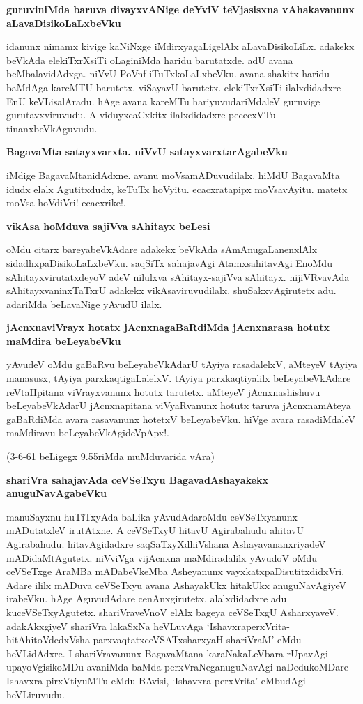 \noindent
\textbf{guruviniMda baruva divayxvANige deYviV teVjasisxna vAhakavanunx aLavaDisikoLaLxbeVku}\label{page79}

idanunx nimamx kivige kaNiNxge iMdirxyagaLigelAlx aLavaDisikoLiLx. adakekx beVkAda elekiTxrXsiTi oLaginiMda haridu barutatxde. adU avana beMbalavidAdxga. niVvU PoVnf iTuTxkoLaLxbeVku. avana shakitx haridu baMdAga kareMTU barutetx. viSayavU barutetx. elekiTxrXsiTi ilalxdidadxre EnU keVLisalAradu. hAge avana kareMTu hariyuvudariMdaleV guruvige gurutavxviruvudu. A viduyxcaCxkitx ilalxdidadxre pececxVTu tinanxbeVkAguvudu.

\noindent
\textbf{BagavaMta satayxvarxta. niVvU satayxvarxtarAgabeVku}\label{page79}

iMdige BagavaMtanidAdxne. avanu moVsamADuvudilalx. hiMdU BagavaMta idudx elalx Agutitxdudx, keTuTx hoVyitu. ecacxratapipx moVsavAyitu. matetx moVsa hoVdiVri! ecacxrike!.

\noindent
\textbf{vikAsa hoMduva sajiVva sAhitayx beLesi}

oMdu citarx bareyabeVkAdare adakekx beVkAda sAmAnugaLanenxlAlx sidadhxpaDisikoLaLxbeVku. saqSiTx sahajavAgi AtamxsahitavAgi EnoMdu sAhitayxvirutatxdeyoV adeV nilulxva sAhitayx-sajiVva sAhitayx. nijiVRvavAda sAhitayxvaninxTaTxrU adakekx vikAsaviruvudilalx. shuSakxvAgirutetx adu. adariMda beLavaNige yAvudU ilalx.

\noindent
\textbf{jAcnxnaviVrayx hotatx jAcnxnagaBaRdiMda jAcnxnarasa hotutx maMdira beLeyabeVku}\label{page79}

yAvudeV oMdu gaBaRvu beLeyabeVkAdarU tAyiya rasadalelxV, aMteyeV tAyiya manasusx, tAyiya parxkaqtigaLalelxV. tAyiya parxkaqtiyalilx beLeyabeVkAdare reVtaHpitana viVrayxvanunx hotutx tarutetx. aMteyeV jAcnxnashishuvu beLeyabeVkAdarU jAcnxnapitana viVyaRvanunx hotutx taruva jAcnxnamAteya gaBaRdiMda avara rasavanunx hotetxV beLeyabeVku. hiVge avara rasadiMdaleV maMdiravu beLeyabeVkAgideVpApx!.

(3-6-61 beLigegx 9.55riMda muMduvarida vAra)

\noindent
\textbf{shariVra sahajavAda ceVSeTxyu BagavadAshayakekx anuguNavAgabeVku}\label{page80}

manuSayxnu huTiTxyAda baLika yAvudAdaroMdu ceVSeTxyanunx mADutatxleV irutAtxne. A ceVSeTxyU hitavU Agirabahudu ahitavU Agirabahudu. hitavAgidadxre saqSaTxyXdhiVshana AshayavananxriyadeV mADidaMtAgutetx. niVviVga vijAcnxna maMdiradalilx yAvudoV oMdu ceVSeTxge AraMBa mADabeVkeMba Asheyanunx vayxkatxpaDisutitxdidxVri. Adare ililx mADuva ceVSeTxyu avana AshayakUkx hitakUkx anuguNavAgiyeV irabeVku. hAge AguvudAdare cenAnxgirutetx. alalxdidadxre adu kuceVSeTxyAgutetx. shariVraveVnoV elAlx bageya ceVSeTxgU AsharxyaveV. adakAkxgiyeV shariVra lakaSxNa heVLuvAga `IshavxraperxVrita-hitAhitoVdedxVsha-parxvaqtatxceVSATxsharxyaH shariVraM'\label{80} eMdu heVLidAdxre. I shariVravanunx BagavaMtana karaNakaLeVbara rUpavAgi upayoVgisikoMDu avaniMda baMda perxVraNeganuguNavAgi naDedukoMDare Ishavxra pirxVtiyuMTu eMdu BAvisi, `Ishavxra perxVrita' eMbudAgi heVLiruvudu.

